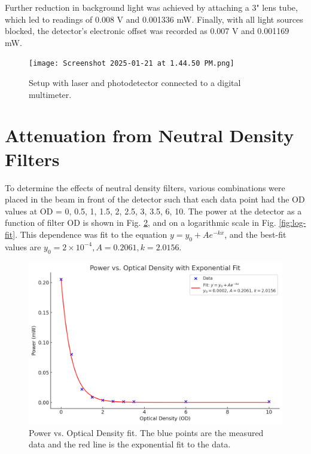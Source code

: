 \documentclass[12pt]{article}
\begin{document}
Further reduction in background light was achieved by attaching a 3" lens tube, which led to readings of 0.008 V and 0.001336 mW. Finally, with all light sources blocked, the detector's electronic offset was recorded as 0.007 V and 0.001169 mW.

\begin{figure}
    \centering
    \texttt{[image: Screenshot 2025-01-21 at 1.44.50 PM.png]}
    \caption{Setup with laser and photodetector connected to a digital multimeter.}
    \label{fig:setup}
\end{figure}

\section*{Attenuation from Neutral Density Filters}
To determine the effects of neutral density filters, various combinations were placed in the beam in front of the detector such that each data point had the OD values at OD = 0, 0.5, 1, 1.5, 2, 2.5, 3, 3.5, 6, 10. The power at the detector as a function of filter OD is shown in Fig. \ref{fig:exp-fit}, and on a logarithmic scale in Fig. \ref{fig:log-fit}. This dependence was fit to the equation \(y = y_0 +Ae^{-kx}\), and the best-fit values are \(y_0 = 2 \times 10^{-4}, A = 0.2061, k = 2.0156\).

\begin{figure} [H]
    \centering
    \includegraphics[width=0.8\linewidth]{Output from ChatGPT (1).png}
    \caption{Power vs. Optical Density fit. The blue points are the measured data and the red line is the exponential fit to the data.}
    \label{fig:exp-fit}
\end{figure}
\end{document}
